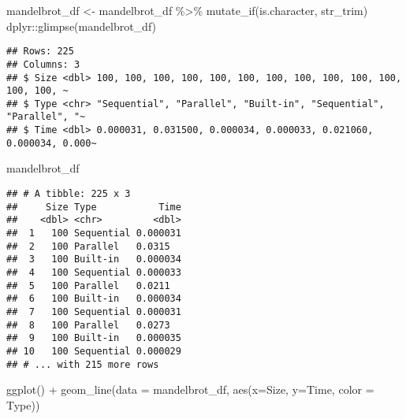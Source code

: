 \documentclass[
]{article}
\newenvironment{Shaded}{\begin{snugshade}}{\end{snugshade}}
\newcommand{\AttributeTok}[1]{\textcolor[rgb]{0.77,0.63,0.00}{#1}}
\newcommand{\FunctionTok}[1]{\textcolor[rgb]{0.00,0.00,0.00}{#1}}
\newcommand{\NormalTok}[1]{#1}
\newcommand{\OtherTok}[1]{\textcolor[rgb]{0.56,0.35,0.01}{#1}}
\newcommand{\SpecialCharTok}[1]{\textcolor[rgb]{0.00,0.00,0.00}{#1}}
\begin{document}
\begin{Shaded}
\begin{Highlighting}[]
\NormalTok{mandelbrot\_df }\OtherTok{\textless{}{-}}\NormalTok{ mandelbrot\_df }\SpecialCharTok{\%\textgreater{}\%} \FunctionTok{mutate\_if}\NormalTok{(is.character, str\_trim)}
\NormalTok{dplyr}\SpecialCharTok{::}\FunctionTok{glimpse}\NormalTok{(mandelbrot\_df)}
\end{Highlighting}
\end{Shaded}

\begin{verbatim}
## Rows: 225
## Columns: 3
## $ Size <dbl> 100, 100, 100, 100, 100, 100, 100, 100, 100, 100, 100, 100, 100, ~
## $ Type <chr> "Sequential", "Parallel", "Built-in", "Sequential", "Parallel", "~
## $ Time <dbl> 0.000031, 0.031500, 0.000034, 0.000033, 0.021060, 0.000034, 0.000~
\end{verbatim}

\begin{Shaded}
\begin{Highlighting}[]
\NormalTok{mandelbrot\_df}
\end{Highlighting}
\end{Shaded}

\begin{verbatim}
## # A tibble: 225 x 3
##     Size Type           Time
##    <dbl> <chr>         <dbl>
##  1   100 Sequential 0.000031
##  2   100 Parallel   0.0315  
##  3   100 Built-in   0.000034
##  4   100 Sequential 0.000033
##  5   100 Parallel   0.0211  
##  6   100 Built-in   0.000034
##  7   100 Sequential 0.000031
##  8   100 Parallel   0.0273  
##  9   100 Built-in   0.000035
## 10   100 Sequential 0.000029
## # ... with 215 more rows
\end{verbatim}

\begin{Shaded}
\end{Shaded}

\begin{Shaded}
\begin{Highlighting}[]
\FunctionTok{ggplot}\NormalTok{() }\SpecialCharTok{+}               
  \FunctionTok{geom\_line}\NormalTok{(}\AttributeTok{data =}\NormalTok{ mandelbrot\_df, }\FunctionTok{aes}\NormalTok{(}\AttributeTok{x=}\NormalTok{Size, }\AttributeTok{y=}\NormalTok{Time, }\AttributeTok{color =}\NormalTok{ Type))}
\end{Highlighting}
\end{Shaded}
\end{document}
